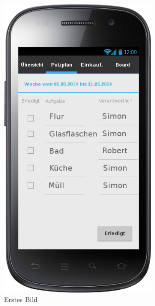 \begin{figure}[H] 
  \centering
     \includegraphics[width=0.7\textwidth]{anhang/mockups/putzplanneuewoche.png}
  \caption{Erstes Bild}
  \label{fig:Bild1}
\end{figure}

